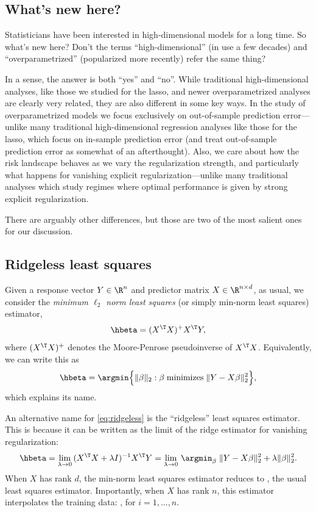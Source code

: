 \documentclass{article}
\begin{document}
\subsection{What's new here?}

Statisticians have been interested in high-dimensional models for a long
time. So what's new here? Don't the terms ``high-dimensional'' (in use a few
decades) and ``overparametrized'' (popularized more recently) refer the same
thing?     

In a sense, the answer is both ``yes'' and ``no''. While traditional
high-dimensional analyses, like those we studied for the lasso, and newer
overparametrized analyses are clearly very related, they are also different in
some key ways. In the study of overparametrized models we focus exclusively on
out-of-sample prediction error---unlike many traditional high-dimensional
regression analyses like those for the lasso, which focus on in-sample
prediction error (and treat out-of-sample prediction error as somewhat of an
afterthought). Also, we care about how the risk landscape behaves as we vary the
regularization strength, and particularly what happens for vanishing explicit 
regularization---unlike many traditional analyses which study regimes where
optimal performance is given by strong explicit regularization.    

There are arguably other differences, but those are two of the most salient ones 
for our discussion.

\subsection{Ridgeless least squares}

Given a response vector $Y \in \R^n$ and predictor matrix $X \in \R^{n \times
  d}$, as usual, we consider the \emph{minimum $\ell_2$ norm least squares} 
(or simply min-norm least squares) estimator,
\begin{equation}
\label{eq:ridgeless}
\hbeta = (X^\T X)^+ X^\T Y,
\end{equation}
where $(X^\T X)^+$ denotes the Moore-Penrose pseudoinverse of $X^\T X$.
Equivalently, we can write this as
\[
\hbeta = \argmin \Big\{ \|\beta\|_2 : \beta \; \text{minimizes} \; \|Y - X
\beta\|_2^2 \Big\},   
\]
which explains its name.  

An alternative name for \eqref{eq:ridgeless} is the ``ridgeless'' least squares 
estimator. This is because it can be written as the limit of the ridge estimator
for vanishing regularization:  
\[
\hbeta = \lim_{\lambda \to 0} \, (X^\T X + \lambda I)^{-1} X^\T Y =   
\lim_{\lambda \to 0} \, \argmin_\beta \; \|Y - X\beta\|_2^2 + \lambda 
\|\beta\|_2^2.   
\]
When $X$ has rank $d$, the min-norm least squares estimator reduces to
, the usual least squares estimator.
Importantly, when $X$ has rank $n$, this estimator interpolates the training 
data: , for $i=1,\dots,n$.   
\end{document}
